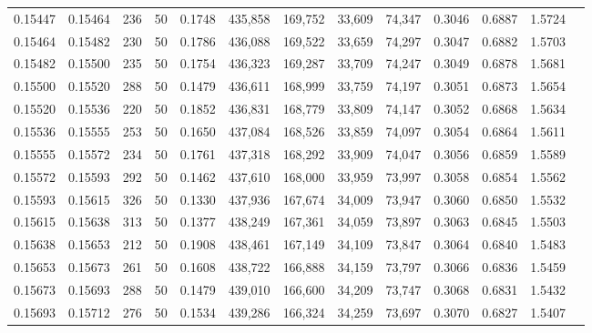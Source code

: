 \begin{tabular}{rrrrrrrrrrrrr}
0.15447 & 0.15464 &   236 &  50 &                                     0.1748 & 435,858 & 169,752 &  33,609 &  74,347 & 0.3046 & 0.6887 & 1.5724 \\
0.15464 & 0.15482 &   230 &  50 &                                     0.1786 & 436,088 & 169,522 &  33,659 &  74,297 & 0.3047 & 0.6882 & 1.5703 \\
0.15482 & 0.15500 &   235 &  50 &                                     0.1754 & 436,323 & 169,287 &  33,709 &  74,247 & 0.3049 & 0.6878 & 1.5681 \\
0.15500 & 0.15520 &   288 &  50 &                                     0.1479 & 436,611 & 168,999 &  33,759 &  74,197 & 0.3051 & 0.6873 & 1.5654 \\
0.15520 & 0.15536 &   220 &  50 &                                     0.1852 & 436,831 & 168,779 &  33,809 &  74,147 & 0.3052 & 0.6868 & 1.5634 \\
0.15536 & 0.15555 &   253 &  50 &                                     0.1650 & 437,084 & 168,526 &  33,859 &  74,097 & 0.3054 & 0.6864 & 1.5611 \\
0.15555 & 0.15572 &   234 &  50 &                                     0.1761 & 437,318 & 168,292 &  33,909 &  74,047 & 0.3056 & 0.6859 & 1.5589 \\
0.15572 & 0.15593 &   292 &  50 &                                     0.1462 & 437,610 & 168,000 &  33,959 &  73,997 & 0.3058 & 0.6854 & 1.5562 \\
0.15593 & 0.15615 &   326 &  50 &                                     0.1330 & 437,936 & 167,674 &  34,009 &  73,947 & 0.3060 & 0.6850 & 1.5532 \\
0.15615 & 0.15638 &   313 &  50 &                                     0.1377 & 438,249 & 167,361 &  34,059 &  73,897 & 0.3063 & 0.6845 & 1.5503 \\
0.15638 & 0.15653 &   212 &  50 &                                     0.1908 & 438,461 & 167,149 &  34,109 &  73,847 & 0.3064 & 0.6840 & 1.5483 \\
0.15653 & 0.15673 &   261 &  50 &                                     0.1608 & 438,722 & 166,888 &  34,159 &  73,797 & 0.3066 & 0.6836 & 1.5459 \\
0.15673 & 0.15693 &   288 &  50 &                                     0.1479 & 439,010 & 166,600 &  34,209 &  73,747 & 0.3068 & 0.6831 & 1.5432 \\
0.15693 & 0.15712 &   276 &  50 &                                     0.1534 & 439,286 & 166,324 &  34,259 &  73,697 & 0.3070 & 0.6827 & 1.5407 \\

\end{tabular}
